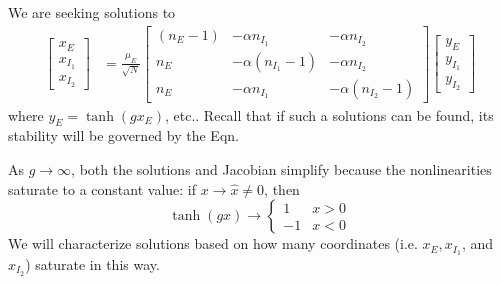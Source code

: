 \documentclass[11pt,reqno]{amsart}
\begin{document}
We are seeking solutions to 
 \begin{align}
 \begin{bmatrix} x_E\\x_{I_1}\\x_{I_2}\end{bmatrix} 
 &= \frac{\mu_E}{\sqrt{N}} 
 \begin{bmatrix} (n_E - 1) & -\alpha n_{I_1} & - \alpha n_{I_2}  \\
 n_E  & -\alpha (n_{I_1}-1) & - \alpha n_{I_2}  \\
 n_E  & -\alpha n_{I_1} & - \alpha (n_{I_2}-1)  
 \end{bmatrix}
 \begin{bmatrix} y_E\\y_{I_1}\\y_{I_2}\end{bmatrix} 
 \label{eqn:matSolgLrg}
 \end{align} 
 where $y_E = \tanh(gx_E)$, etc..
 Recall that if such a solutions can be found, its stability will be governed by the Eqn. 
 
 As $g \rightarrow \infty$, both the solutions and Jacobian simplify because the nonlinearities saturate to a constant value: if $x \rightarrow \hat{x} \not= 0$, then
\[ \tanh(gx) \rightarrow \left\{ \begin{matrix*} 1 & x > 0\\
    -1 & x < 0
    \end{matrix*}
    \right.
 \] 
 We will characterize solutions based on how many coordinates (i.e. $x_E, x_{I_1}$, and $x_{I_2}$) saturate in this way.
 
\end{document}
